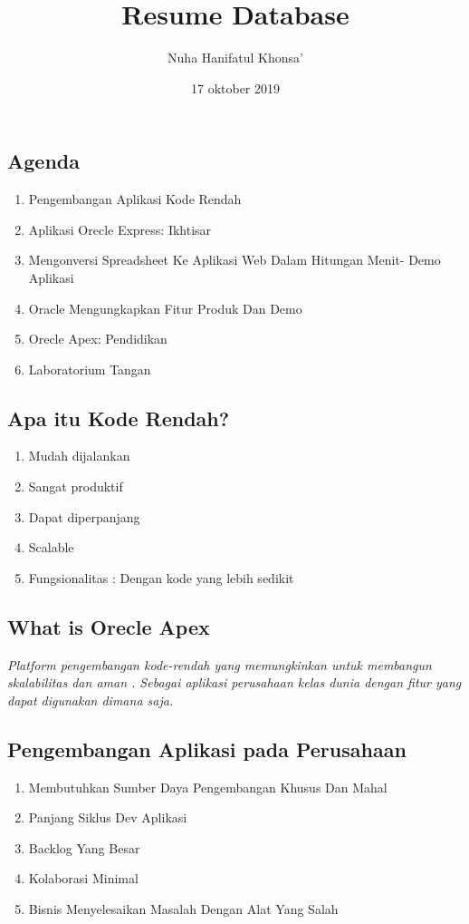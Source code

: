 \documentclass[a4paper,12pt]{report}
\title{Resume Database}
\author{Nuha Hanifatul Khonsa'}
\date{17 oktober 2019}
\begin{document}
\maketitle

\chapter{}
\section{Agenda}
\begin{enumerate}
    \item Pengembangan Aplikasi Kode Rendah
    \item Aplikasi Orecle Express: Ikhtisar
    \item Mengonversi Spreadsheet Ke Aplikasi Web Dalam Hitungan Menit- Demo Aplikasi
    \item Oracle Mengungkapkan Fitur Produk Dan Demo
    \item Orecle Apex: Pendidikan
    \item Laboratorium Tangan
\end{enumerate}

\section{Apa itu Kode Rendah?}
\begin{enumerate}
    \item Mudah dijalankan
    \item Sangat produktif
    \item Dapat diperpanjang
    \item Scalable
    \item Fungsionalitas : Dengan kode yang lebih sedikit 
\end{enumerate}

\section{What is Orecle Apex}
\textit{Platform pengembangan kode-rendah  yang memungkinkan untuk membangun skalabilitas dan aman . Sebagai aplikasi perusahaan kelas dunia dengan fitur yang dapat digunakan dimana saja.}

\section{Pengembangan Aplikasi pada Perusahaan}
\begin{enumerate}
    \item Membutuhkan Sumber Daya Pengembangan Khusus Dan Mahal
    \item Panjang Siklus Dev Aplikasi
    \item Backlog Yang Besar
    \item Kolaborasi Minimal
    \item Bisnis Menyelesaikan Masalah Dengan Alat Yang Salah
\end{enumerate}
\end{document}
